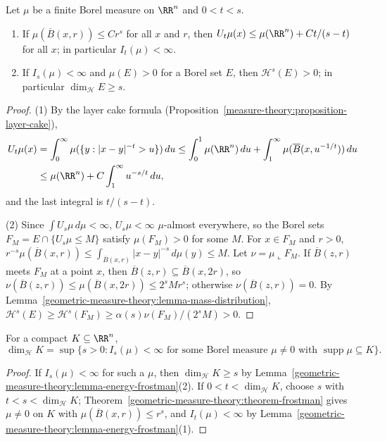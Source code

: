 \begin{lemma}\label{geometric-measure-theory:lemma-energy-frostman}
Let $\mu$ be a finite Borel measure on $\RR^n$ and $0 < t < s$.
\begin{enumerate}
\item If $\mu(\overline{B}(x, r)) \leq Cr^s$ for all $x$ and $r$, then $U_t\mu(x) \leq \mu(\RR^n) + Ct/(s - t)$ for all $x$; in particular $I_t(\mu) < \infty$.
\item If $I_s(\mu) < \infty$ and $\mu(E) > 0$ for a Borel set $E$, then $\mathcal{H}^s(E) > 0$; in particular $\dim_{\mathcal{H}}E \geq s$.
\end{enumerate}
\end{lemma}

\begin{proof}
(1) By the layer cake formula (Proposition~\ref{measure-theory:proposition-layer-cake}),
\[\begin{aligned}
U_t\mu(x) &= \int_0^\infty\mu(\{y : |x - y|^{-t} > u\})\,du \leq \int_0^1\mu(\RR^n)\,du + \int_1^\infty\mu(\overline{B}(x, u^{-1/t}))\,du \\
&\leq \mu(\RR^n) + C\int_1^\infty u^{-s/t}\,du,
\end{aligned}\]
and the last integral is $t/(s - t)$.

(2) Since $\int U_s\mu\,d\mu < \infty$, $U_s\mu < \infty$ $\mu$-almost everywhere, so the Borel sets $F_M = E \cap \{U_s\mu \leq M\}$ satisfy $\mu(F_M) > 0$ for some $M$. For $x \in F_M$ and $r > 0$,
$r^{-s}\mu(\overline{B}(x, r)) \leq \int_{\overline{B}(x, r)}|x - y|^{-s}\,d\mu(y) \leq M$. Let $\nu = \mu\llcorner F_M$. If $\overline{B}(z, r)$ meets $F_M$ at a point $x$, then $\overline{B}(z, r) \subseteq \overline{B}(x, 2r)$, so
$\nu(\overline{B}(z, r)) \leq \mu(\overline{B}(x, 2r)) \leq 2^sMr^s$; otherwise $\nu(\overline{B}(z, r)) = 0$. By Lemma~\ref{geometric-measure-theory:lemma-mass-distribution},
$\mathcal{H}^s(E) \geq \mathcal{H}^s(F_M) \geq \alpha(s)\nu(F_M)/(2^sM) > 0$.
\end{proof}

\begin{theorem}\label{geometric-measure-theory:theorem-energy-dimension}
For a compact $K \subseteq \RR^n$,
\[
\dim_{\mathcal{H}}K = \sup\{s > 0 : I_s(\mu) < \infty \text{ for some Borel measure } \mu \neq 0 \text{ with } \operatorname{supp}\mu \subseteq K\}.
\]
\end{theorem}

\begin{proof}
If $I_s(\mu) < \infty$ for such a $\mu$, then $\dim_{\mathcal{H}}K \geq s$ by Lemma~\ref{geometric-measure-theory:lemma-energy-frostman}(2). If $0 < t < \dim_{\mathcal{H}}K$, choose $s$ with $t < s < \dim_{\mathcal{H}}K$;
Theorem~\ref{geometric-measure-theory:theorem-frostman} gives $\mu \neq 0$ on $K$ with $\mu(\overline{B}(x, r)) \leq r^s$, and $I_t(\mu) < \infty$ by Lemma~\ref{geometric-measure-theory:lemma-energy-frostman}(1).
\end{proof}

